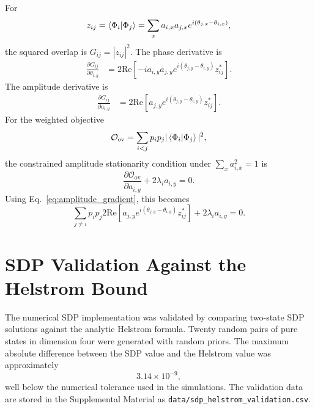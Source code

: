\documentclass[
 reprint,
 amsmath,amssymb,
 aps,
 pra,
 floatfix,
]{revtex4-2}
\begin{document}
For
\begin{equation}
    z_{ij}=\braket{\Phi_i|\Phi_j}
    =
    \sum_x a_{i,x}a_{j,x}
    e^{i(\theta_{j,x}-\theta_{i,x})},
\end{equation}
the squared overlap is $G_{ij}=|z_{ij}|^2$. The phase derivative is
\begin{align}
    \frac{\partial G_{ij}}{\partial \theta_{i,y}}
    &=
    2\mathrm{Re}\left[
    -i a_{i,y}a_{j,y}
    e^{i(\theta_{j,y}-\theta_{i,y})}
    z_{ij}^{*}
    \right].
    \label{eq:phase_gradient}
\end{align}
The amplitude derivative is
\begin{align}
    \frac{\partial G_{ij}}{\partial a_{i,y}}
    &=
    2\mathrm{Re}\left[
    a_{j,y}e^{i(\theta_{j,y}-\theta_{i,y})}
    z_{ij}^{*}
    \right].
    \label{eq:amplitude_gradient}
\end{align}
For the weighted objective
\begin{equation}
    \mathcal{O}_{\mathrm{ov}}
    =
    \sum_{i<j}p_ip_j|\braket{\Phi_i|\Phi_j}|^2,
\end{equation}
the constrained amplitude stationarity condition under
$\sum_xa_{i,x}^2=1$ is
\begin{equation}
    \frac{\partial \mathcal{O}_{\mathrm{ov}}}{\partial a_{i,y}}
    +
    2\lambda_i a_{i,y}
    =
    0.
    \label{eq:lagrange_stationary}
\end{equation}
Using Eq.~\eqref{eq:amplitude_gradient}, this becomes
\begin{equation}
    \sum_{j\neq i} p_ip_j 2\mathrm{Re}\left[
    a_{j,y}e^{i(\theta_{j,y}-\theta_{i,y})}
    z_{ij}^{*}
    \right]
    +
    2\lambda_i a_{i,y}
    =
    0.
    \label{eq:amplitude_optimality}
\end{equation}

\section{SDP Validation Against the Helstrom Bound}
\label{app:sdp_validation}

The numerical SDP implementation was validated by comparing two-state SDP solutions against the analytic Helstrom formula. Twenty random pairs of pure states in dimension four were generated with random priors. The maximum absolute difference between the SDP value and the Helstrom value was approximately
\begin{equation}
    3.14\times10^{-9},
\end{equation}
well below the numerical tolerance used in the simulations. The validation data are stored in the Supplemental Material as \texttt{data/sdp\_helstrom\_validation.csv}.
\end{document}
